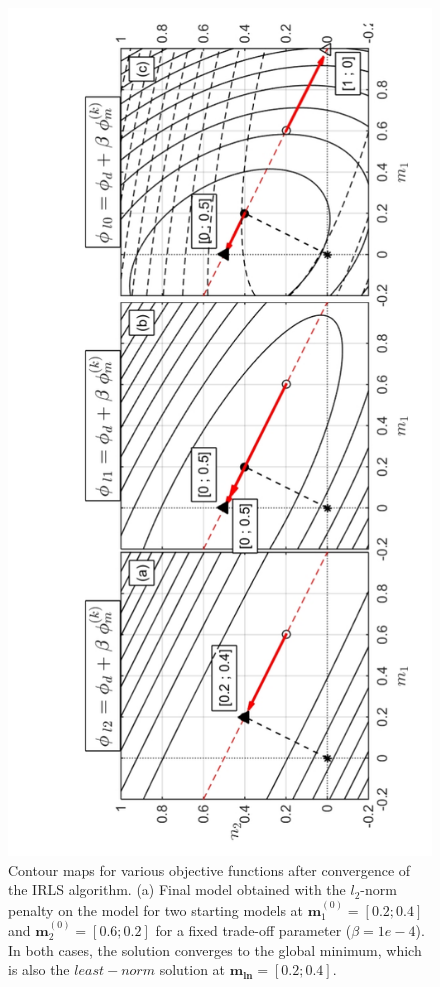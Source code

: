 \begin{figure}[h!]
\centering
\includegraphics[scale=0.58,angle=270]{IRLS_toy_Result}
\caption{Contour maps for various objective functions after convergence of the IRLS algorithm. (a) Final model obtained with the $l_2$-norm penalty on the model for two starting models at $\mathbf{m}_1^{(0)}=[0.2;0.4]$ and $\mathbf{m}_2^{(0)}=[0.6;0.2]$ for a fixed trade-off parameter ($\beta = 1e-4$). In both cases, the solution converges to the global minimum, which is also the $least-norm$ solution at  $\mathbf{m_{ln}}=[0.2;0.4]$. 
}
\end{figure}
